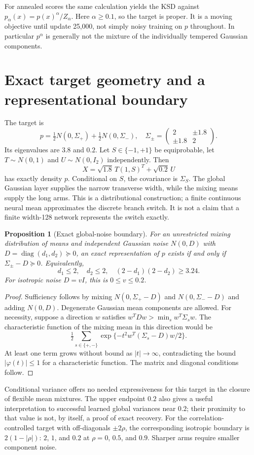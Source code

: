 \documentclass[11pt,a4paper]{article}
\newtheorem{proposition}{Proposition}[section]
\numberwithin{equation}{section}
\newcommand{\diag}{\operatorname{diag}}
\begin{document}
For annealed scores the same calculation yields the KSD against
$p_\alpha(x)=p(x)^\alpha/Z_\alpha$. Here $\alpha\geq0.1$, so the target is
proper. It is a moving objective until update 25,000, not simply noisy training
on $p$ throughout. In particular $p^\alpha$ is generally not the mixture of
the individually tempered Gaussian components.

\section{Exact target geometry and a representational boundary}
The target is
\[
 p=\tfrac12N(0,\Sigma_+)+\tfrac12N(0,\Sigma_-),\quad
 \Sigma_\pm=\begin{pmatrix}2&\pm1.8\\\pm1.8&2\end{pmatrix}.
\]
Its eigenvalues are $3.8$ and $0.2$. Let $S\in\{-1,+1\}$ be equiprobable,
let $T\sim N(0,1)$ and $U\sim N(0,I_2)$ independently. Then
\begin{equation}
 X=\sqrt{1.8}\,T(1,S)^T+\sqrt{0.2}\,U
 \label{eq:exact}
\end{equation}
has exactly density $p$. Conditional on $S$, the covariance is $\Sigma_S$.
The global Gaussian layer supplies the narrow transverse width, while the
mixing means supply the long arms. This is a distributional construction;
a finite continuous neural mean approximates the discrete branch switch.
It is not a claim that a finite width-128 network represents the switch exactly.

\begin{proposition}[Exact global-noise boundary]
For an unrestricted mixing distribution of means and independent Gaussian
noise $N(0,D)$ with $D=\diag(d_1,d_2)\succeq0$, an exact representation of
$p$ exists if and only if $\Sigma_\pm-D\succeq0$. Equivalently,
\[
 d_1\leq2,\quad d_2\leq2,\quad (2-d_1)(2-d_2)\geq3.24.
\]
For isotropic noise $D=vI$, this is $0\leq v\leq0.2$.
\end{proposition}
\begin{proof}
Sufficiency follows by mixing $N(0,\Sigma_+-D)$ and
$N(0,\Sigma_--D)$ and adding $N(0,D)$. Degenerate Gaussian mean
components are allowed. For necessity, suppose a direction $w$ satisfies
$w^TDw>\min_s w^T\Sigma_s w$. The characteristic function of the mixing
mean in this direction would be
\[
 \tfrac12\sum_{s\in\{+,-\}}
  \exp\{-t^2w^T(\Sigma_s-D)w/2\}.
\]
At least one term grows without bound as $|t|\to\infty$, contradicting the
bound $|\varphi(t)|\leq1$ for a characteristic function. The matrix and
diagonal conditions follow.
\end{proof}
Conditional variance offers no needed expressiveness for this target in the
closure of flexible mean mixtures. The upper endpoint $0.2$ also gives a
useful interpretation to successful learned global variances near $0.2$;
their proximity to that value is not, by itself, a proof of exact recovery.
For the correlation-controlled target with off-diagonals $\pm2\rho$,
the corresponding isotropic boundary is $2(1-|\rho|)$: $2$, $1$, and $0.2$
at $\rho=0$, $0.5$, and $0.9$. Sharper arms require smaller component noise.
\end{document}
